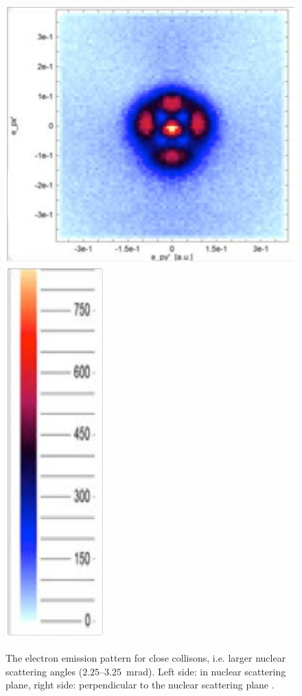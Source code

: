 \documentclass{article}
\begin{document}
\begin{figure}
\begin{center}
\includegraphics[scale=0.4]{figures/HeExp_results2c}
\includegraphics[scale=0.4]{figures/HeExp_results2d}
\caption{The electron emission pattern for close collisons, i.e. larger nuclear scattering angles ($2.25$--$3.25$~mrad). Left side: in nuclear scattering plane, right side: perpendicular to the nuclear scattering plane \citep{SchmidtLEtal2014Vortices}.}
\label{fig:HeExp_results2}
\end{center}
\end{figure}
\end{document}
